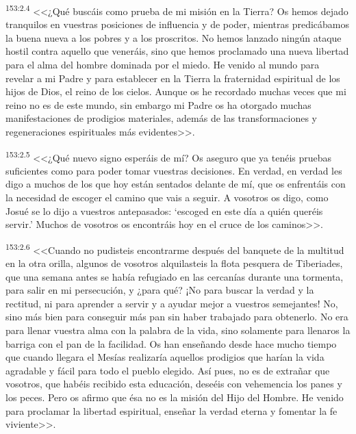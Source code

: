 \par 
\textsuperscript{153:2.4} <<¿Qué buscáis como prueba de mi misión en la Tierra? Os hemos dejado tranquilos en vuestras posiciones de influencia y de poder, mientras predicábamos la buena nueva a los pobres y a los proscritos. No hemos lanzado ningún ataque hostil contra aquello que veneráis, sino que hemos proclamado una nueva libertad para el alma del hombre dominada por el miedo. He venido al mundo para revelar a mi Padre y para establecer en la Tierra la fraternidad espiritual de los hijos de Dios, el reino de los cielos. Aunque os he recordado muchas veces que mi reino no es de este mundo, sin embargo mi Padre os ha otorgado muchas manifestaciones de prodigios materiales, además de las transformaciones y regeneraciones espirituales más evidentes>>.

\par 
\textsuperscript{153:2.5} <<¿Qué nuevo signo esperáis de mí? Os aseguro que ya tenéis pruebas suficientes como para poder tomar vuestras decisiones. En verdad, en verdad les digo a muchos de los que hoy están sentados delante de mí, que os enfrentáis con la necesidad de escoger el camino que vais a seguir. A vosotros os digo, como Josué se lo dijo a vuestros antepasados: `escoged en este día a quién queréis servir.' Muchos de vosotros os encontráis hoy en el cruce de los caminos>>.

\par 
\textsuperscript{153:2.6} <<Cuando no pudisteis encontrarme después del banquete de la multitud en la otra orilla, algunos de vosotros alquilasteis la flota pesquera de Tiberiades, que una semana antes se había refugiado en las cercanías durante una tormenta, para salir en mi persecución, y ¿para qué? ¡No para buscar la verdad y la rectitud, ni para aprender a servir y a ayudar mejor a vuestros semejantes! No, sino más bien para conseguir más pan sin haber trabajado para obtenerlo. No era para llenar vuestra alma con la palabra de la vida, sino solamente para llenaros la barriga con el pan de la facilidad. Os han enseñando desde hace mucho tiempo que cuando llegara el Mesías realizaría aquellos prodigios que harían la vida agradable y fácil para todo el pueblo elegido. Así pues, no es de extrañar que vosotros, que habéis recibido esta educación, deseéis con vehemencia los panes y los peces. Pero os afirmo que ésa no es la misión del Hijo del Hombre. He venido para proclamar la libertad espiritual, enseñar la verdad eterna y fomentar la fe viviente>>.

